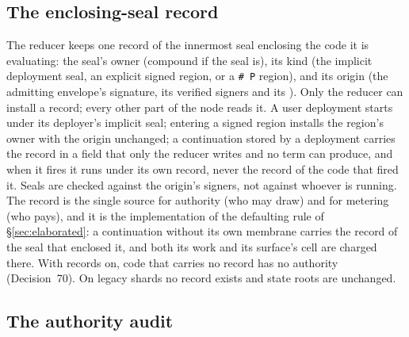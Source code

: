 \documentclass[11pt]{article}
\newcommand{\code}{\path}
\begin{document}
\subsection{The enclosing-seal record}\label{sec:sealrecord}

The reducer keeps one record of the innermost seal enclosing the code it is evaluating: the seal's owner (compound if the seal is), its kind (the implicit deployment seal, an explicit signed region, or a \texttt{\# P} region), and its origin (the admitting envelope's signature, its verified signers and its \code{phloPrice}). Only the reducer can install a record; every other part of the node reads it. A user deployment starts under its deployer's implicit seal; entering a signed region installs the region's owner with the origin unchanged; a continuation stored by a deployment carries the record in a field that only the reducer writes and no term can produce, and when it fires it runs under its own record, never the record of the code that fired it. Seals are checked against the origin's signers, not against whoever is running. The record is the single source for authority (who may draw) and for metering (who pays), and it is the implementation of the defaulting rule of \S\ref{sec:elaborated}: a continuation without its own membrane carries the record of the seal that enclosed it, and both its work and its surface's cell are charged there. With records on, code that carries no record has no authority (Decision~70). On legacy shards no record exists and state roots are unchanged.

\subsection{The authority audit}\label{sec:audit}
\end{document}
